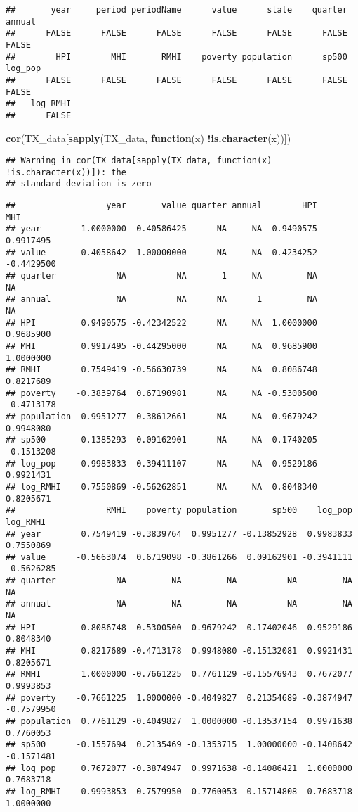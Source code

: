 \documentclass[
]{article}
\newenvironment{Shaded}{\begin{snugshade}}{\end{snugshade}}
\newcommand{\ControlFlowTok}[1]{\textcolor[rgb]{0.13,0.29,0.53}{\textbf{#1}}}
\newcommand{\KeywordTok}[1]{\textcolor[rgb]{0.13,0.29,0.53}{\textbf{#1}}}
\newcommand{\NormalTok}[1]{#1}
\newcommand{\OperatorTok}[1]{\textcolor[rgb]{0.81,0.36,0.00}{\textbf{#1}}}
\begin{document}
\begin{verbatim}
##       year     period periodName      value      state    quarter     annual 
##      FALSE      FALSE      FALSE      FALSE      FALSE      FALSE      FALSE 
##        HPI        MHI       RMHI    poverty population      sp500    log_pop 
##      FALSE      FALSE      FALSE      FALSE      FALSE      FALSE      FALSE 
##   log_RMHI 
##      FALSE
\end{verbatim}

\begin{Shaded}
\begin{Highlighting}[]
\KeywordTok{cor}\NormalTok{(TX_data[}\KeywordTok{sapply}\NormalTok{(TX_data, }\ControlFlowTok{function}\NormalTok{(x) }\OperatorTok{!}\KeywordTok{is.character}\NormalTok{(x))])}
\end{Highlighting}
\end{Shaded}

\begin{verbatim}
## Warning in cor(TX_data[sapply(TX_data, function(x) !is.character(x))]): the
## standard deviation is zero
\end{verbatim}

\begin{verbatim}
##                  year       value quarter annual        HPI        MHI
## year        1.0000000 -0.40586425      NA     NA  0.9490575  0.9917495
## value      -0.4058642  1.00000000      NA     NA -0.4234252 -0.4429500
## quarter            NA          NA       1     NA         NA         NA
## annual             NA          NA      NA      1         NA         NA
## HPI         0.9490575 -0.42342522      NA     NA  1.0000000  0.9685900
## MHI         0.9917495 -0.44295000      NA     NA  0.9685900  1.0000000
## RMHI        0.7549419 -0.56630739      NA     NA  0.8086748  0.8217689
## poverty    -0.3839764  0.67190981      NA     NA -0.5300500 -0.4713178
## population  0.9951277 -0.38612661      NA     NA  0.9679242  0.9948080
## sp500      -0.1385293  0.09162901      NA     NA -0.1740205 -0.1513208
## log_pop     0.9983833 -0.39411107      NA     NA  0.9529186  0.9921431
## log_RMHI    0.7550869 -0.56262851      NA     NA  0.8048340  0.8205671
##                  RMHI    poverty population       sp500    log_pop   log_RMHI
## year        0.7549419 -0.3839764  0.9951277 -0.13852928  0.9983833  0.7550869
## value      -0.5663074  0.6719098 -0.3861266  0.09162901 -0.3941111 -0.5626285
## quarter            NA         NA         NA          NA         NA         NA
## annual             NA         NA         NA          NA         NA         NA
## HPI         0.8086748 -0.5300500  0.9679242 -0.17402046  0.9529186  0.8048340
## MHI         0.8217689 -0.4713178  0.9948080 -0.15132081  0.9921431  0.8205671
## RMHI        1.0000000 -0.7661225  0.7761129 -0.15576943  0.7672077  0.9993853
## poverty    -0.7661225  1.0000000 -0.4049827  0.21354689 -0.3874947 -0.7579950
## population  0.7761129 -0.4049827  1.0000000 -0.13537154  0.9971638  0.7760053
## sp500      -0.1557694  0.2135469 -0.1353715  1.00000000 -0.1408642 -0.1571481
## log_pop     0.7672077 -0.3874947  0.9971638 -0.14086421  1.0000000  0.7683718
## log_RMHI    0.9993853 -0.7579950  0.7760053 -0.15714808  0.7683718  1.0000000
\end{verbatim}
\end{document}

